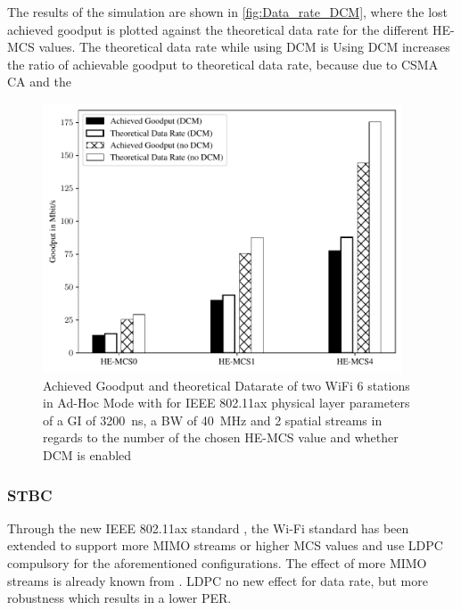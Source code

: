 The results of the simulation are shown in \autoref{fig:Data_rate_DCM}, where the lost achieved goodput is plotted against
the theoretical data rate for the different HE-\ac{MCS} values. The theoretical data rate while using \ac{DCM} is Using \ac{DCM} increases the ratio of achievable goodput to
theoretical data rate, because due to CSMA CA and the

\begin{figure}%
	\centering
	\includegraphics[width=0.95\textwidth]{figures/DCM_dataRate_simulation.pdf}
	\caption{Achieved Goodput and theoretical Datarate of two WiFi 6 stations in Ad-Hoc Mode with for IEEE 802.11ax physical layer parameters of a \ac{GI} of \SI{3200}{\nano\second}, a \ac{BW} of \SI{40}{\mega\hertz} and 2 spatial streams  in regards to the number of the chosen HE-\ac{MCS} value and whether \ac{DCM} is enabled}%
	\label{fig:Data_rate_DCM}%
\end{figure}

\subsubsection*{\acf{STBC}}



Through the new IEEE 802.11ax standard \cite{noauthor_ieee_2021}, the Wi-Fi standard has been extended to support more \ac{MIMO} streams or higher \ac{MCS} values and use \ac{LDPC} compulsory for the
aforementioned configurations. The effect of more \ac{MIMO} streams is already known from \cite{Lot of stuff}.
\ac{LDPC} no new effect for data rate, but more robustness which results in a lower \ac{PER}.